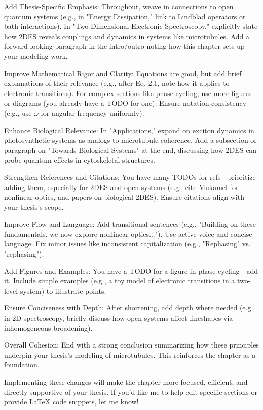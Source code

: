 {Add Thesis-Specific Emphasis: Throughout, weave in connections to open quantum systems (e.g., in "Energy Dissipation," link to Lindblad operators or bath interactions). In "Two-Dimensional Electronic Spectroscopy," explicitly state how 2DES reveals couplings and dynamics in systems like microtubules. Add a forward-looking paragraph in the intro/outro noting how this chapter sets up your modeling work.

Improve Mathematical Rigor and Clarity: Equations are good, but add brief explanations of their relevance (e.g., after Eq. 2.1, note how it applies to electronic transitions). For complex sections like phase cycling, use more figures or diagrams (you already have a TODO for one). Ensure notation consistency (e.g., use $\omega$ for angular frequency uniformly).

Enhance Biological Relevance: In "Applications," expand on exciton dynamics in photosynthetic systems as analogs to microtubule coherence. Add a subsection or paragraph on "Towards Biological Systems" at the end, discussing how 2DES can probe quantum effects in cytoskeletal structures.

Strengthen References and Citations: You have many TODOs for refs—prioritize adding them, especially for 2DES and open systems (e.g., cite Mukamel for nonlinear optics, and papers on biological 2DES). Ensure citations align with your thesis's scope.

Improve Flow and Language: Add transitional sentences (e.g., "Building on these fundamentals, we now explore nonlinear optics..."). Use active voice and concise language. Fix minor issues like inconsistent capitalization (e.g., "Rephasing" vs. "rephasing").

Add Figures and Examples: You have a TODO for a figure in phase cycling—add it. Include simple examples (e.g., a toy model of electronic transitions in a two-level system) to illustrate points.

Ensure Conciseness with Depth: After shortening, add depth where needed (e.g., in 2D spectroscopy, briefly discuss how open systems affect lineshapes via inhomogeneous broadening).

Overall Cohesion: End with a strong conclusion summarizing how these principles underpin your thesis's modeling of microtubules. This reinforces the chapter as a foundation.

Implementing these changes will make the chapter more focused, efficient, and directly supportive of your thesis. If you'd like me to help edit specific sections or provide LaTeX code snippets, let me know!



}